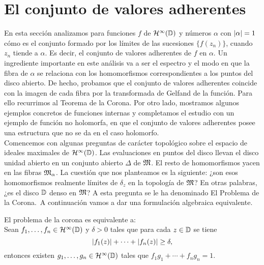 \section{El conjunto de valores adherentes}

En esta sección analizamos para funciones $f$ de $\mathcal{H}^{\infty}(\mathbb{D})$ y números $\alpha$ con $\left\lvert\alpha\right\rvert = 1$ cómo es el conjunto formado por los límites de las sucesiones $\{f(z_n)\}$, cuando $z_n$ tiende a $\alpha$. Es decir, el conjunto de valores adherentes de $f$ en $\alpha$. Un ingrediente importante en este análisis va a ser el espectro y el modo en que la fibra de $\alpha$ se relaciona con los homomorfismos correspondientes a los puntos del disco abierto. De hecho, probamos que el conjunto de valores adherentes coincide con la imagen de cada fibra por la transformada de Gelfand de la función. Para ello recurrimos al Teorema de la Corona. Por otro lado, mostramos algunos ejemplos concretos de funciones internas y completamos el estudio con un ejemplo de función no holomorfa, en que el conjunto de valores adherentes posee una estructura que no se da en el caso holomorfo. \\

Comencemos con algunas preguntas de carácter topológico sobre el espacio de ideales maximales de $\mathcal{H}^{\infty}(\mathbb{D})$. Las evaluaciones en puntos del disco llevan el disco unidad abierto en un conjunto abierto $\Delta$ de $\mathfrak{M}$. El resto de homomorfismos yacen en las fibras $\mathfrak{M}_\alpha$. La cuestión que nos planteamos es la siguiente: ¿son esos homomorfismos realmente límites de $\delta_z$ en la topología de $\mathfrak{M}$? En otras palabras, ¿es el disco $\mathbb{D}$ denso en $\mathfrak{M}$? A esta
pregunta se le ha denominado El Problema de la Corona. A continuación vamos a dar una formulación algebraica equivalente.\\

\begin{theorem}
    El problema de la corona es equivalente a: \\

    Sean $f_1, \dots, f_n \in \mathcal{H}^{\infty}(\mathbb{D})$ y $\delta > 0$ tales que para cada $z \in \mathbb{D}$ se tiene
\begin{equation*}
    \left\lvert f_1(z)\right\rvert + \cdots + \left\lvert f_n(z)\right\rvert \geq \delta,
\end{equation*}
     entonces existen $g_1, \dots, g_n \in \mathcal{H}^{\infty}(\mathbb{D})$ tales que $f_1 g_1 + \cdots + f_n g_n = 1$.

\end{theorem}


